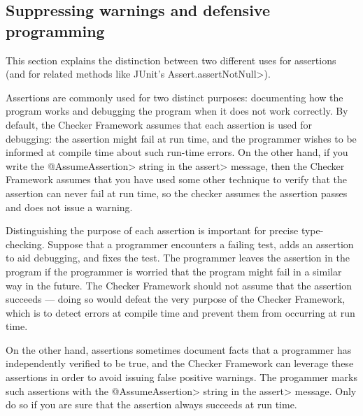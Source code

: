 \subsection{Suppressing warnings and defensive programming\label{defensive-programming}}

This section explains the distinction between two different uses for
assertions (and for related methods like JUnit's \<Assert.assertNotNull>).

Assertions are commonly used for two distinct purposes:  documenting how
the program works and debugging the program when it does not work
correctly.  By default, the Checker Framework assumes that each assertion
is used for debugging:  the assertion might fail at run time, and the programmer
wishes to be informed at compile time about such run-time errors.  On the
other hand, if you write the \<@AssumeAssertion> string in the \<assert>
message, then the Checker Framework assumes that you have used some other
technique to verify that the assertion can never fail at run time, so the
checker assumes the assertion passes and does not issue a warning.

Distinguishing the purpose of each assertion is important for precise
type-checking.  
Suppose that a
programmer encounters a failing test, adds an assertion to aid debugging, and fixes the
test.  The programmer leaves the assertion in the program if the programmer
is worried that the program might fail in a similar way in the future.  
The Checker Framework should not assume that the assertion succeeds ---
doing so would defeat the very purpose of the Checker Framework, which is
to detect errors at compile time and prevent them from occurring at run
time.

On the other hand, assertions sometimes document facts that a programmer
has independently verified to be true, and the Checker Framework can
leverage these assertions in order to avoid issuing false positive
warnings.  The progammer marks such assertions with the \<@AssumeAssertion>
string in the \<assert> message.  Only do so if you are sure
that the assertion always succeeds at run time.


